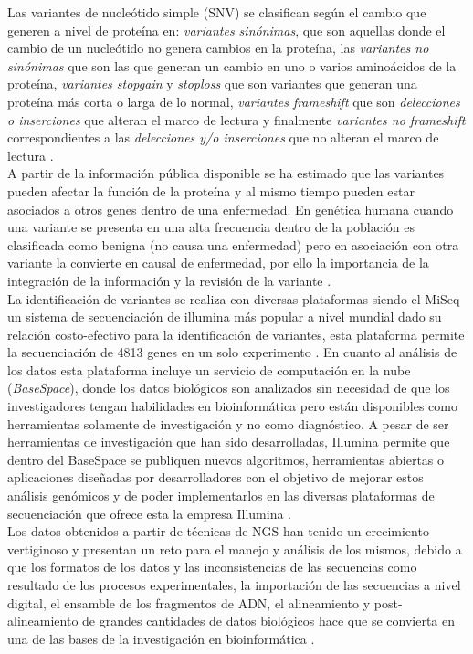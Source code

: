 Las variantes de nucleótido simple (SNV) se clasifican según el cambio que generen a nivel de proteína en: \textit{variantes sinónimas}, que son aquellas donde el cambio de un nucleótido no genera cambios en la proteína, las \textit{variantes no sinónimas} que son las que generan un cambio en uno o varios aminoácidos de la proteína, \textit{variantes stopgain} y \textit{stoploss} que son variantes que generan una proteína más corta o larga de lo normal, \textit{variantes frameshift} que son \textit{delecciones o inserciones} que alteran el marco de lectura y finalmente \textit{variantes no frameshift} correspondientes a las \textit{delecciones y/o inserciones} que no alteran el marco de lectura \cite{Liu2016}.\\


A partir de la información pública disponible se ha estimado que las variantes pueden afectar la función de la proteína y al mismo tiempo pueden estar asociados a otros genes dentro de una enfermedad. En genética humana cuando una variante se presenta en una alta frecuencia dentro de la población es clasificada como benigna (no causa una enfermedad) pero en asociación con otra variante la convierte en causal de enfermedad, por ello la importancia de la integración de la información y la revisión de la variante \cite{Shendure2016}.\\

La identificación de variantes se realiza con diversas plataformas siendo el MiSeq un sistema de secuenciación de illumina  más popular a nivel mundial dado su relación costo-efectivo para la identificación de variantes, esta plataforma permite la secuenciación de 4813 genes en un solo experimento \cite{Illumina2017}. En cuanto al análisis de los datos esta plataforma incluye un servicio de computación en la nube (\textit{BaseSpace}), donde los datos biológicos son analizados  sin necesidad de que los investigadores tengan habilidades en bioinformática pero están disponibles como herramientas solamente de investigación y no como diagnóstico. A pesar de ser herramientas de investigación  que han sido desarrolladas, Illumina permite que dentro del BaseSpace se publiquen nuevos algoritmos, herramientas abiertas o aplicaciones diseñadas por desarrolladores con el objetivo de mejorar estos análisis genómicos y  de poder implementarlos en las diversas plataformas de secuenciación que ofrece esta la empresa Illumina \cite{Illumina2017}. \\

Los datos obtenidos a partir de técnicas de NGS han tenido un crecimiento vertiginoso y presentan un reto para el manejo y análisis de los mismos, debido a que los formatos de los datos y las inconsistencias de las secuencias como resultado de los procesos experimentales, la importación de las secuencias a nivel digital, el ensamble de los fragmentos de ADN, el alineamiento y post-alineamiento de grandes cantidades de datos biológicos hace que se convierta en una de las bases de la investigación en bioinformática \cite{Deng2011,Triplet2014}.

